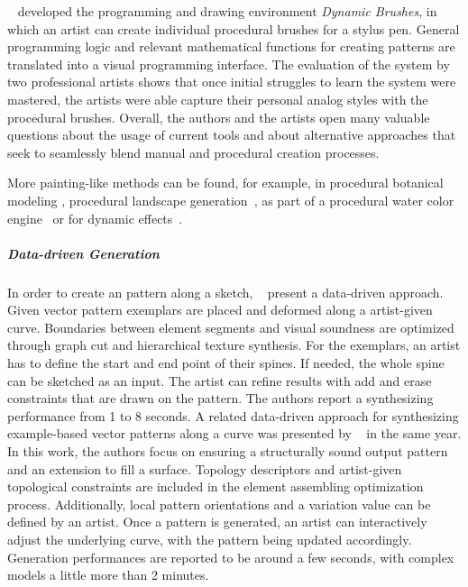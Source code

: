 \citeauthor*{jacobs_2018_dbe}~\cite{jacobs_2018_dbe} developed the programming and drawing environment \textit{Dynamic Brushes}, in which an artist can create individual procedural brushes for a stylus pen. General programming logic and relevant mathematical functions for creating patterns are translated into a visual programming interface. The evaluation of the system by two professional artists shows that once initial struggles to learn the system were mastered, the artists were able capture their personal analog styles with the procedural brushes. Overall, the authors and the artists open many valuable questions about the usage of current tools and about alternative approaches that seek to seamlessly blend manual and procedural creation processes.

More painting-like methods can be found, for example, in procedural botanical modeling \cite{anastacio_2008_spl,chen_2008_stm,palubicki_2009_sot}, procedural landscape generation~\cite{emilien_2015_wie}, as part of a procedural water color engine~\cite{diverdi_2013_ppp} or for dynamic effects~\cite{xing_2016_eit}. 



\subparagraph{Data-driven Generation}
\label{subpara:analysis_rulebased_sketchbased_datadriven}

In order to create an pattern along a sketch, \citeauthor*{lu_2014_dds}~\cite{lu_2014_dds} present a data-driven approach. Given vector pattern exemplars are placed and deformed along a artist-given curve. Boundaries between element segments and visual soundness are optimized through graph cut and hierarchical texture synthesis. For the exemplars, an artist has to define the start and end point of their spines. If needed, the whole spine can be sketched as an input. The artist can refine results with add and erase constraints that are drawn on the pattern. The authors report a synthesizing performance from 1 to 8 seconds. A related data-driven approach for synthesizing example-based vector patterns along a curve was presented by \citeauthor*{zhou_2014_tsv}~\cite{zhou_2014_tsv} in the same year. In this work, the authors focus on ensuring a structurally sound output pattern and an extension to fill a surface. Topology descriptors and artist-given topological constraints are included in the element assembling optimization process. Additionally, local pattern orientations and a variation value can be defined by an artist. Once a pattern is generated, an artist can interactively adjust the underlying curve, with the pattern being updated accordingly. Generation performances are reported to be around a few seconds, with complex models a little more than 2 minutes.

